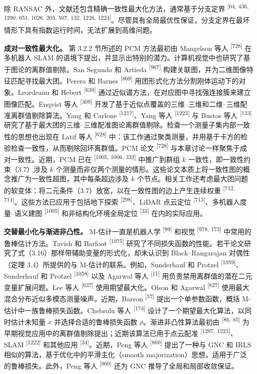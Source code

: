 除 RANSAC 外，文献还包含精确一致性最大化方法，通常基于分支定界 \textsuperscript{[64, 436, 1290, 651, 1026, 203, 507, 132, 1226, 1224]}。尽管具有全局最优性保证，分支定界在最坏情形下具有指数运行时间，无法扩展到高维问题。

\textbf{成对一致性最大化。} 第 3.2.2 节所述的 PCM 方法最初由 Mangelson 等人 \textsuperscript{[728]} 在多机器人 SLAM 的语境下提出，并显示出特别的潜力。计算机视觉中也研究了基于图论的离群值剔除。San Segundo 和 Artieda \textsuperscript{[967]} 构建关联图，并为二维图像特征匹配寻找最大团。Perera 和 Barnes \textsuperscript{[869]} 用团形式化方法分割刚体运动下的对象。Leordeanu 和 Hebert \textsuperscript{[639]} 通过近似谱方法，在对应图中寻找强连接簇来建立图像匹配。Enqvist 等人 \textsuperscript{[309]} 开发了基于近似点覆盖的三维–三维和二维–三维配准离群值剔除算法。Yang 和 Carlone \textsuperscript{[1217]}、Yang 等人 \textsuperscript{[1223]} 与 Bustos 等人 \textsuperscript{[133]} 研究了基于最大团的三维–三维配准图论离群值剔除。检查一个测量子集内部一致性的思想也出现在 Latif 等人 \textsuperscript{[628]} 中：该工作通过聚类测量，并用基于卡方的检验检查一致性，从而剔除回环离群值。PCM 论文 \textsuperscript{[728]} 与本章讨论一样聚焦于成对一致性。近期，PCM 已在 \textsuperscript{[1005, 1006, 332]} 中推广到群组 $k$ 一致性，即一致性约束（3.7）涉及 $k$ 个测量而非仅两个测量的情形。这些论文本质上将一致性图的概念推广为一致性超图，其中每条超边涉及 $k$ 个节点。相关工作还考虑最大团问题的软变体：将二元条件（3.7）放宽，以在一致性图的边上产生连续权重 \textsuperscript{[712, 711]}。这些方法已应用于包括地下探索 \textsuperscript{[298]}、LiDAR 点云定位 \textsuperscript{[713]}、多机器人度量–语义建图 \textsuperscript{[1095]} 和非结构化环境全局定位 \textsuperscript{[33]} 在内的实际应用。

\textbf{交替最小化与渐进非凸性。} M-估计一直是机器人学 \textsuperscript{[99]} 和视觉 \textsuperscript{[978, 173]} 中常用的鲁棒估计方法。Tavish 和 Barfoot \textsuperscript{[1075]} 研究了不同损失函数的性能。若干论文研究了式（3.16）那样带辅助变量的形式化，却未认识到 Black–Rangarajan 对偶性（定理 3.4）所提供的与 M-估计的联系。例如，Sunderhauf 和 Protzel \textsuperscript{[1059]}、Sunderhauf 和 Protzel \textsuperscript{[1058]} 以及 Agarwal 等人 \textsuperscript{[11]} 用负责禁用离群值的潜在二元变量扩展问题。Lee 等人 \textsuperscript{[637]} 使用期望最大化。Olson 和 Agarwal \textsuperscript{[827]} 使用最大混合分布近似多模态测量噪声。近期，Barron \textsuperscript{[57]} 提出一个单参数函数，概括 M-估计中一族鲁棒损失函数。Chebrolu 等人 \textsuperscript{[174]} 设计了一个期望最大化算法，以同时估计未知量 $x$ 并选择合适的鲁棒损失函数 $\rho$。渐进非凸性算法最初由 \textsuperscript{[86, 85]} 为早期视觉应用中的离群值剔除提出；近期该算法已用于点云配准 \textsuperscript{[1297, 1223]}、SLAM \textsuperscript{[1222]} 和其他应用 \textsuperscript{[34]}。近期，Peng 等人 \textsuperscript{[860]} 提出了一种与 GNC 和 IRLS 相似的算法，基于优化中的平滑主化（smooth majorization）思想，适用于广泛的鲁棒损失。此外，Peng 等人 \textsuperscript{[860]} 还为 GNC 推导了全局和局部收敛保证。

